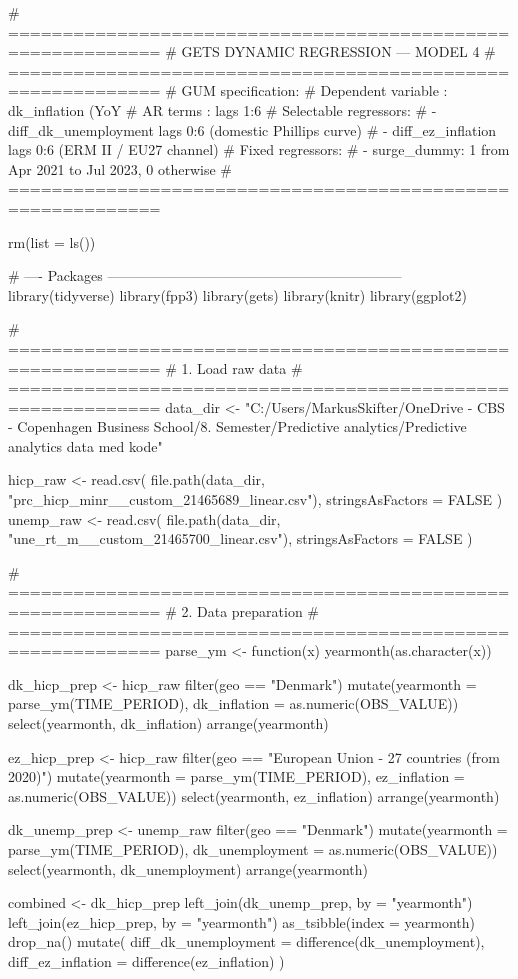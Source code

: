 # ============================================================
# GETS DYNAMIC REGRESSION — MODEL 4
# ============================================================
# GUM specification:
#   Dependent variable : dk_inflation (YoY %
#   AR terms           : lags 1:6
#   Selectable regressors:
#     - diff_dk_unemployment lags 0:6  (domestic Phillips curve)
#     - diff_ez_inflation    lags 0:6  (ERM II / EU27 channel)
#   Fixed regressors:
#     - surge_dummy: 1 from Apr 2021 to Jul 2023, 0 otherwise
# ============================================================

rm(list = ls())

# ---- Packages ---------------------------------------------------------------
library(tidyverse)
library(fpp3)
library(gets)
library(knitr)
library(ggplot2)

# ============================================================
# 1. Load raw data
# ============================================================
data_dir <- "C:/Users/MarkusSkifter/OneDrive - CBS - Copenhagen Business School/8. Semester/Predictive analytics/Predictive analytics data med kode"

hicp_raw  <- read.csv(
  file.path(data_dir, "prc_hicp_minr__custom_21465689_linear.csv"),
  stringsAsFactors = FALSE
)
unemp_raw <- read.csv(
  file.path(data_dir, "une_rt_m__custom_21465700_linear.csv"),
  stringsAsFactors = FALSE
)

# ============================================================
# 2. Data preparation
# ============================================================
parse_ym <- function(x) yearmonth(as.character(x))

dk_hicp_prep <- hicp_raw %
  filter(geo == "Denmark") %
  mutate(yearmonth    = parse_ym(TIME_PERIOD),
         dk_inflation = as.numeric(OBS_VALUE)) %
  select(yearmonth, dk_inflation) %
  arrange(yearmonth)

ez_hicp_prep <- hicp_raw %
  filter(geo == "European Union - 27 countries (from 2020)") %
  mutate(yearmonth    = parse_ym(TIME_PERIOD),
         ez_inflation = as.numeric(OBS_VALUE)) %
  select(yearmonth, ez_inflation) %
  arrange(yearmonth)

dk_unemp_prep <- unemp_raw %
  filter(geo == "Denmark") %
  mutate(yearmonth       = parse_ym(TIME_PERIOD),
         dk_unemployment = as.numeric(OBS_VALUE)) %
  select(yearmonth, dk_unemployment) %
  arrange(yearmonth)

combined <- dk_hicp_prep %
  left_join(dk_unemp_prep, by = "yearmonth") %
  left_join(ez_hicp_prep,  by = "yearmonth") %
  as_tsibble(index = yearmonth) %
  drop_na() %
  mutate(
    diff_dk_unemployment = difference(dk_unemployment),
    diff_ez_inflation    = difference(ez_inflation)
  )

